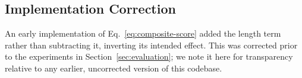 


\subsection{Implementation Correction}
\label{subsec:sign-correction}

An early implementation of Eq.~\eqref{eq:composite-score} added the length
term rather than subtracting it, inverting its intended effect. This was
corrected prior to the experiments in Section~\ref{sec:evaluation}; we note
it here for transparency relative to any earlier, uncorrected version of this
codebase.
